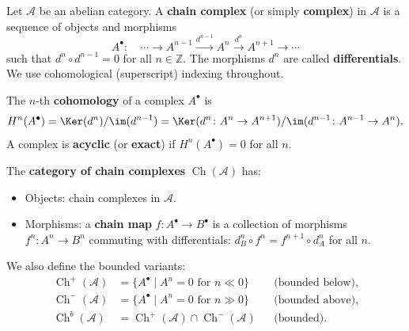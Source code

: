 \begin{definition}\label{def:chain-complex}
Let $\mathcal{A}$ be an abelian category. A \textbf{chain complex} (or simply \textbf{complex})
in $\mathcal{A}$ is a sequence of objects and morphisms
\[
    A^\bullet \colon \quad \cdots \longrightarrow A^{n-1} \xrightarrow{d^{n-1}} A^n
    \xrightarrow{d^n} A^{n+1} \longrightarrow \cdots
\]
such that $d^n \circ d^{n-1} = 0$ for all $n \in \mathbb{Z}$. The morphisms $d^n$ are
called \textbf{differentials}. We use cohomological (superscript)
indexing throughout.
\end{definition}

\begin{definition}[Cohomology]\label{def:cohomology-complex}
The $n$-th \textbf{cohomology} of a complex $A^\bullet$ is
\[
    H^n(A^\bullet) = \Ker(d^n) / \im(d^{n-1}) = \Ker(d^n \colon A^n \to A^{n+1}) /
    \im(d^{n-1} \colon A^{n-1} \to A^n).
\]
A complex is \textbf{acyclic} (or \textbf{exact}) if $H^n(A^\bullet) = 0$
for all $n$.
\end{definition}

\begin{definition}\label{def:complex-category}
The \textbf{category of chain complexes} $\operatorname{Ch}(\mathcal{A})$ has:
\begin{itemize}
    \item Objects: chain complexes in $\mathcal{A}$.
    \item Morphisms: a \textbf{chain map} $f \colon A^\bullet \to B^\bullet$
    is a collection of morphisms $f^n \colon A^n \to B^n$ commuting with differentials:
    $d_B^n \circ f^n = f^{n+1} \circ d_A^n$ for all $n$.
\end{itemize}
We also define the bounded variants:
\begin{align*}
    \operatorname{Ch}^+(\mathcal{A}) &= \{ A^\bullet \mid A^n = 0 \text{ for } n \ll 0 \}
    &&\text{(bounded below)}, \\
    \operatorname{Ch}^-(\mathcal{A}) &= \{ A^\bullet \mid A^n = 0 \text{ for } n \gg 0 \}
    &&\text{(bounded above)}, \\
    \operatorname{Ch}^b(\mathcal{A}) &= \operatorname{Ch}^+(\mathcal{A}) \cap \operatorname{Ch}^-(\mathcal{A})
    &&\text{(bounded)}.
\end{align*}
\end{definition}

